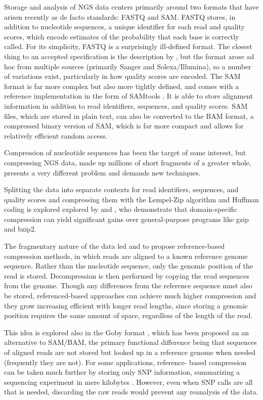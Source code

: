 \documentclass[twocolumn]{article}
\begin{document}
Storage and analysis of NGS data centers primarily around two formats that
have arisen recently as de facto standards: FASTQ and SAM. FASTQ stores, in
addition to nucleotide sequences, a unique identifier for each read and
quality scores, which encode estimates of the probability that each base is
correctly called. For its simplicity, FASTQ is a surprisingly ill-defined
format. The closest thing to an accepted specification is the description by
\citet{Cock2010}, but the format arose ad hoc from multiple sources (primarily
Sanger and Solexa/Illumina), so a number of variations exist, particularly in
how quality scores are encoded. The SAM format is far more complex but also
more tightly defined, and comes with a reference implementation in the form of
SAMtools \citep{Li2009b}. It is able to store alignment information in
addition to read identifiers, sequences, and quality scores. SAM files, which
are stored in plain text, can also be converted to the BAM format, a
compressed binary version of SAM, which is far more compact and allows for
relatively efficient random access.


Compression of nucleotide sequences has been the target of some interest, but
compressing NGS data, made up millions of short fragments of a greater whole,
presents a very different problem and demands new techniques.

Splitting the data into separate contexts for read identifiers, sequences, and
quality scores and compressing them with the Lempel-Zip algorithm and Huffman
coding is explored explored by \citet{Tembe2010} and \citet{Deorowicz2011},
who demonstrate that domain-specific compression can yield significant
gains over general-purpose programs like gzip and bzip2.

The fragmentary nature of the data led \citet{Kozanitis2011} and \citet{Hsi-
YangFritz2011} to propose reference-based compression methods, in which reads
are aligned to a known reference genome sequence. Rather than the nucleotide
sequence, only the genomic position of the read is stored. Decompression is
then performed by copying the read sequences from the genome. Though any
differences from the reference sequence must also be stored, referenced-based
approaches can achieve much higher compression and they grow increasing
efficient with longer read lengths, since storing a genomic position requires
the same amount of space, regardless of the length of the read.

This idea is explored also in the Goby format \citep{Goby2012}, which has been
proposed an an alternative to SAM/BAM, the primary functional difference being
that sequences of aligned reads are not stored but looked up in a reference
genome when needed (frequently they are not). For some applications, reference-
based compression can be taken much further by storing only SNP information,
summarizing a sequencing experiment in mere kilobytes \citep{Christley2009}.
However, even when SNP calls are all that is needed, discarding the raw reads
would prevent any reanalysis of the data.
\end{document}
